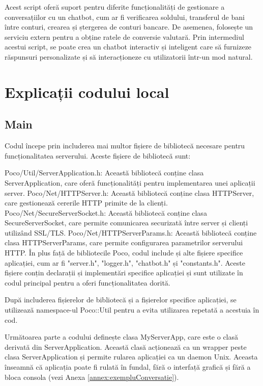 Acest script oferă suport pentru diferite funcționalități de gestionare a conversațiilor cu un chatbot, cum ar fi verificarea soldului, transferul de bani între conturi, crearea și ștergerea de conturi bancare. De asemenea, folosește un serviciu extern pentru a obține ratele de conversie valutară. Prin intermediul acestui script, se poate crea un chatbot interactiv și inteligent care să furnizeze răspunsuri personalizate și să interacționeze cu utilizatorii într-un mod natural.

\chapter{Explicații codului local}

\section{Main}

Codul începe prin includerea mai multor fișiere de bibliotecă necesare pentru funcționalitatea serverului. Aceste fișiere de bibliotecă sunt:

Poco/Util/ServerApplication.h: Această bibliotecă conține clasa ServerApplication, care oferă funcționalități pentru implementarea unei aplicații server.
Poco/Net/HTTPServer.h: Această bibliotecă conține clasa HTTPServer, care gestionează cererile HTTP primite de la clienți.
Poco/Net/SecureServerSocket.h: Această bibliotecă conține clasa SecureServerSocket, care permite comunicarea securizată între server și clienți utilizând SSL/TLS.
Poco/Net/HTTPServerParams.h: Această bibliotecă conține clasa HTTPServerParams, care permite configurarea parametrilor serverului HTTP.
În plus față de bibliotecile Poco, codul include și alte fișiere specifice aplicației, cum ar fi "server.h", "logger.h", "chatbot.h" și "constants.h". Aceste fișiere conțin declarații și implementări specifice aplicației și sunt utilizate în codul principal pentru a oferi funcționalitatea dorită.

După includerea fișierelor de bibliotecă și a fișierelor specifice aplicației, se utilizează namespace-ul Poco::Util pentru a evita utilizarea repetată a acestuia în cod.

Următoarea parte a codului definește clasa MyServerApp, care este o clasă derivată din ServerApplication. Această clasă acționează ca un wrapper peste clasa ServerApplication și permite rularea aplicației ca un daemon Unix. Aceasta înseamnă că aplicația poate fi rulată în fundal, fără o interfață grafică și fără a bloca consola (vezi Anexa \ref{annex:exempluConversatie}).

